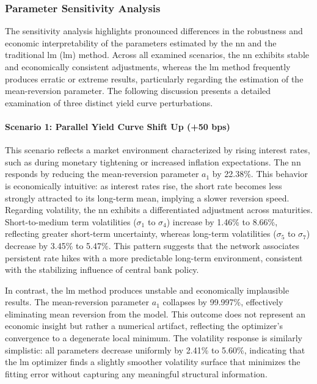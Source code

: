 \subsubsection{Parameter Sensitivity Analysis}
The sensitivity analysis highlights pronounced differences in the robustness and economic interpretability of the parameters estimated by the \ac{nn} and the traditional \ac{lm} (\ac{lm}) method. Across all examined scenarios, the \ac{nn} exhibits stable and economically consistent adjustments, whereas the \ac{lm} method frequently produces erratic or extreme results, particularly regarding the estimation of the mean-reversion parameter. The following discussion presents a detailed examination of three distinct yield curve perturbations.

\paragraph{Scenario 1: Parallel Yield Curve Shift Up (+50 \ac{bps})}
This scenario reflects a market environment characterized by rising interest rates, such as during monetary tightening or increased inflation expectations. The \ac{nn} responds by reducing the mean-reversion parameter \( a_1 \) by 22.38\%. This behavior is economically intuitive: as interest rates rise, the short rate becomes less strongly attracted to its long-term mean, implying a slower reversion speed. Regarding volatility, the \ac{nn} exhibits a differentiated adjustment across maturities. Short-to-medium term volatilities (\( \sigma_1 \) to \( \sigma_4 \)) increase by 1.46\% to 8.66\%, reflecting greater short-term uncertainty, whereas long-term volatilities (\( \sigma_5 \) to \( \sigma_7 \)) decrease by 3.45\% to 5.47\%. This pattern suggests that the network associates persistent rate hikes with a more predictable long-term environment, consistent with the stabilizing influence of central bank policy.

In contrast, the \ac{lm} method produces unstable and economically implausible results. The mean-reversion parameter \( a_1 \) collapses by 99.997\%, effectively eliminating mean reversion from the model. This outcome does not represent an economic insight but rather a numerical artifact, reflecting the optimizer's convergence to a degenerate local minimum. The volatility response is similarly simplistic: all parameters decrease uniformly by 2.41\% to 5.60\%, indicating that the \ac{lm} optimizer finds a slightly smoother volatility surface that minimizes the fitting error without capturing any meaningful structural information.

